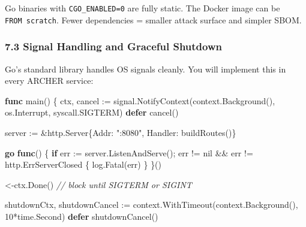 \documentclass[
]{article}
\newenvironment{Shaded}{}{}
\newcommand{\CommentTok}[1]{\textcolor[rgb]{0.38,0.63,0.69}{\textit{#1}}}
\newcommand{\ControlFlowTok}[1]{\textcolor[rgb]{0.00,0.44,0.13}{\textbf{#1}}}
\newcommand{\DecValTok}[1]{\textcolor[rgb]{0.25,0.63,0.44}{#1}}
\newcommand{\KeywordTok}[1]{\textcolor[rgb]{0.00,0.44,0.13}{\textbf{#1}}}
\newcommand{\NormalTok}[1]{#1}
\newcommand{\OperatorTok}[1]{\textcolor[rgb]{0.40,0.40,0.40}{#1}}
\newcommand{\OtherTok}[1]{\textcolor[rgb]{0.00,0.44,0.13}{#1}}
\newcommand{\StringTok}[1]{\textcolor[rgb]{0.25,0.44,0.63}{#1}}
\begin{document}
Go binaries with \texttt{CGO\_ENABLED=0} are fully static. The Docker
image can be \texttt{FROM\ scratch}. Fewer dependencies = smaller attack
surface and simpler SBOM.

\hypertarget{signal-handling-and-graceful-shutdown}{%
\subsubsection{7.3 Signal Handling and Graceful
Shutdown}\label{signal-handling-and-graceful-shutdown}}

Go's standard library handles OS signals cleanly. You will implement
this in every ARCHER service:

\begin{Shaded}
\begin{Highlighting}[]
\KeywordTok{func}\NormalTok{ main}\OperatorTok{()} \OperatorTok{\{}
\NormalTok{    ctx}\OperatorTok{,}\NormalTok{ cancel }\OperatorTok{:=}\NormalTok{ signal}\OperatorTok{.}\NormalTok{NotifyContext}\OperatorTok{(}\NormalTok{context}\OperatorTok{.}\NormalTok{Background}\OperatorTok{(),}\NormalTok{ os}\OperatorTok{.}\NormalTok{Interrupt}\OperatorTok{,}\NormalTok{ syscall}\OperatorTok{.}\NormalTok{SIGTERM}\OperatorTok{)}
    \ControlFlowTok{defer}\NormalTok{ cancel}\OperatorTok{()}

\NormalTok{    server }\OperatorTok{:=} \OperatorTok{\&}\NormalTok{http}\OperatorTok{.}\NormalTok{Server}\OperatorTok{\{}\NormalTok{Addr}\OperatorTok{:} \StringTok{":8080"}\OperatorTok{,}\NormalTok{ Handler}\OperatorTok{:}\NormalTok{ buildRoutes}\OperatorTok{()\}}

    \ControlFlowTok{go} \KeywordTok{func}\OperatorTok{()} \OperatorTok{\{}
        \ControlFlowTok{if}\NormalTok{ err }\OperatorTok{:=}\NormalTok{ server}\OperatorTok{.}\NormalTok{ListenAndServe}\OperatorTok{();}\NormalTok{ err }\OperatorTok{!=} \OtherTok{nil} \OperatorTok{\&\&}\NormalTok{ err }\OperatorTok{!=}\NormalTok{ http}\OperatorTok{.}\NormalTok{ErrServerClosed }\OperatorTok{\{}
\NormalTok{            log}\OperatorTok{.}\NormalTok{Fatal}\OperatorTok{(}\NormalTok{err}\OperatorTok{)}
        \OperatorTok{\}}
    \OperatorTok{\}()}

    \OperatorTok{\textless{}{-}}\NormalTok{ctx}\OperatorTok{.}\NormalTok{Done}\OperatorTok{()} \CommentTok{// block until SIGTERM or SIGINT}

\NormalTok{    shutdownCtx}\OperatorTok{,}\NormalTok{ shutdownCancel }\OperatorTok{:=}\NormalTok{ context}\OperatorTok{.}\NormalTok{WithTimeout}\OperatorTok{(}\NormalTok{context}\OperatorTok{.}\NormalTok{Background}\OperatorTok{(),} \DecValTok{10}\OperatorTok{*}\NormalTok{time}\OperatorTok{.}\NormalTok{Second}\OperatorTok{)}
    \ControlFlowTok{defer}\NormalTok{ shutdownCancel}\OperatorTok{()}


\end{Highlighting}
\end{Shaded}
\end{document}
